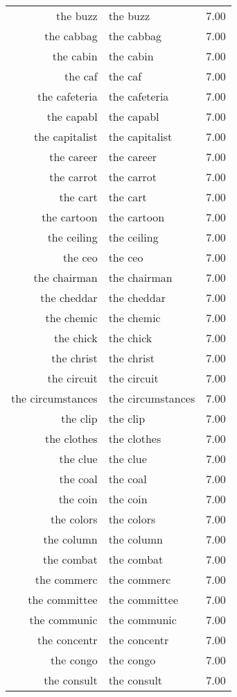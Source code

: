 \begin{table}[ht]
\begin{tabular}{rlr}
  the buzz & the buzz & 7.00 \\ 
  the cabbag & the cabbag & 7.00 \\ 
  the cabin & the cabin & 7.00 \\ 
  the caf & the caf & 7.00 \\ 
  the cafeteria & the cafeteria & 7.00 \\ 
  the capabl & the capabl & 7.00 \\ 
  the capitalist & the capitalist & 7.00 \\ 
  the career & the career & 7.00 \\ 
  the carrot & the carrot & 7.00 \\ 
  the cart & the cart & 7.00 \\ 
  the cartoon & the cartoon & 7.00 \\ 
  the ceiling & the ceiling & 7.00 \\ 
  the ceo & the ceo & 7.00 \\ 
  the chairman & the chairman & 7.00 \\ 
  the cheddar & the cheddar & 7.00 \\ 
  the chemic & the chemic & 7.00 \\ 
  the chick & the chick & 7.00 \\ 
  the christ & the christ & 7.00 \\ 
  the circuit & the circuit & 7.00 \\ 
  the circumstances & the circumstances & 7.00 \\ 
  the clip & the clip & 7.00 \\ 
  the clothes & the clothes & 7.00 \\ 
  the clue & the clue & 7.00 \\ 
  the coal & the coal & 7.00 \\ 
  the coin & the coin & 7.00 \\ 
  the colors & the colors & 7.00 \\ 
  the column & the column & 7.00 \\ 
  the combat & the combat & 7.00 \\ 
  the commerc & the commerc & 7.00 \\ 
  the committee & the committee & 7.00 \\ 
  the communic & the communic & 7.00 \\ 
  the concentr & the concentr & 7.00 \\ 
  the congo & the congo & 7.00 \\ 
  the consult & the consult & 7.00 \\ 

\end{tabular}
\end{table}
